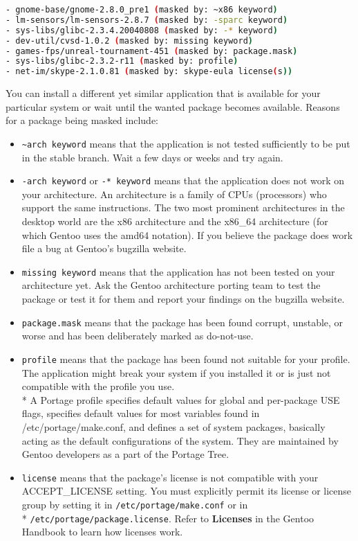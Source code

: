 \documentclass[11pt]{article}
\begin{document}
\begin{itemize}
\begin{lstlisting}[basicstyle=\ttfamily, backgroundcolor = \color{lightgray}, language = bash, xleftmargin = 0cm, framexleftmargin = 1em, framexrightmargin = 2em, showstringspaces=false]
- gnome-base/gnome-2.8.0_pre1 (masked by: ~x86 keyword)
- lm-sensors/lm-sensors-2.8.7 (masked by: -sparc keyword)
- sys-libs/glibc-2.3.4.20040808 (masked by: -* keyword)
- dev-util/cvsd-1.0.2 (masked by: missing keyword)
- games-fps/unreal-tournament-451 (masked by: package.mask)
- sys-libs/glibc-2.3.2-r11 (masked by: profile)
- net-im/skype-2.1.0.81 (masked by: skype-eula license(s)) 
\end{lstlisting}
       You can install a different yet similar application that is available for your particular system or wait until the wanted package becomes available. Reasons for a package being masked include:
       \begin{itemize}
         \item \verb|~arch keyword| means that the application is not tested sufficiently to be put in the stable branch. Wait a few days or weeks and try again.
         \item \verb|-arch keyword| or \verb|-* keyword| means that the application does not work on your architecture. An architecture is a family of CPUs (processors) who support the same instructions. The two most prominent architectures in the desktop world are the x86 architecture and the x86\_64 architecture (for which Gentoo uses the amd64 notation). If you believe the package does work file a bug at Gentoo's bugzilla website.
         \item \verb|missing keyword| means that the application has not been tested on your architecture yet. Ask the Gentoo architecture porting team to test the package or test it for them and report your findings on the bugzilla website.
         \item \verb|package.mask| means that the package has been found corrupt, unstable, or worse and has been deliberately marked as do-not-use.
         \item \verb|profile| means that the package has been found not suitable for your profile. The application might break your system if you installed it or is just not compatible with the profile you use. 
         \\* A Portage profile specifies default values for global and per-package USE flags, specifies default values for most variables found in /etc/portage/make.conf, and defines a set of system packages, basically acting as the default configurations of the system. They are maintained by Gentoo developers as a part of the Portage Tree.
         \item \verb|license| means that the package's license is not compatible with your ACCEPT\_LICENSE setting. You must explicitly permit its license or license group by setting it in \verb|/etc/portage/make.conf| or in \\* \verb|/etc/portage/package.license|. Refer to \textbf{Licenses} in the Gentoo Handbook to learn how licenses work.
       \end{itemize}
    

\end{itemize}
\end{document}
